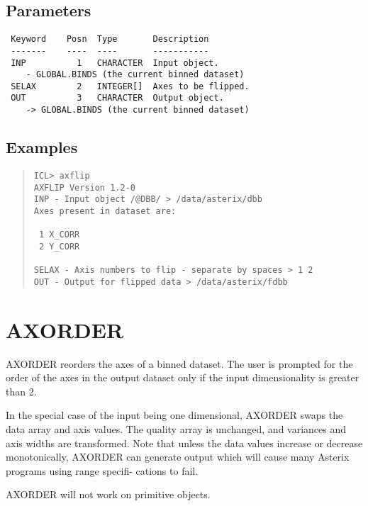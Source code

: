 \documentclass{book}
\renewcommand{\_}{{\tt\char'137}}     %
\begin{document}
\subsection{Parameters}
\begin{verbatim}
 Keyword    Posn  Type       Description
 -------    ----  ----       -----------
 INP          1   CHARACTER  Input object.
    - GLOBAL.BINDS (the current binned dataset)
 SELAX        2   INTEGER[]  Axes to be flipped.
 OUT          3   CHARACTER  Output object.
    -> GLOBAL.BINDS (the current binned dataset)

\end{verbatim}\subsection{Examples}
\begin{quote}\begin{verbatim}
ICL> axflip
AXFLIP Version 1.2-0
INP - Input object /@DBB/ > /data/asterix/dbb
Axes present in dataset are:

 1 X_CORR
 2 Y_CORR

SELAX - Axis numbers to flip - separate by spaces > 1 2
OUT - Output for flipped data > /data/asterix/fdbb
\end{verbatim}\end{quote}
\section{AXORDER}
AXORDER reorders the axes of a binned dataset. The user is prompted
for the order of the axes in the output dataset only if the input
dimensionality is greater than 2.

In the special case of the input being one dimensional, AXORDER
swaps the data array and axis values. The quality array is unchanged,
and variances and axis widths are transformed. Note that unless the
data values increase or decrease monotonically, AXORDER can generate
output which will cause many Asterix programs using range specifi-
cations to fail.

AXORDER will not work on primitive objects.
\end{document}
